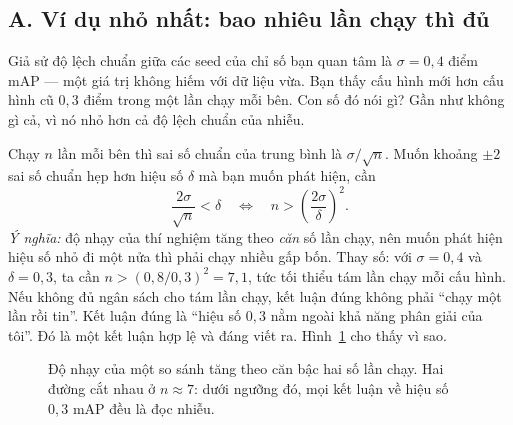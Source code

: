 \documentclass[../../deep_learning.tex]{subfiles}
\begin{document}

\subsection{A. Ví dụ nhỏ nhất: bao nhiêu lần chạy thì đủ}
Giả sử độ lệch chuẩn giữa các seed của chỉ số bạn quan tâm là $\sigma = 0{,}4$ điểm mAP --- một giá trị không hiếm với dữ liệu vừa. Bạn thấy cấu hình mới hơn cấu hình cũ $0{,}3$ điểm trong một lần chạy mỗi bên. Con số đó nói gì? Gần như không gì cả, vì nó nhỏ hơn cả độ lệch chuẩn của nhiễu.

Chạy $n$ lần mỗi bên thì sai số chuẩn của trung bình là $\sigma/\sqrt{n}$. Muốn khoảng $\pm 2$ sai số chuẩn hẹp hơn hiệu số $\delta$ mà bạn muốn phát hiện, cần
\[
\frac{2\sigma}{\sqrt{n}} < \delta \quad\Longleftrightarrow\quad n > \left(\frac{2\sigma}{\delta}\right)^{2}.
\]
\emph{Ý nghĩa:} độ nhạy của thí nghiệm tăng theo \emph{căn} số lần chạy, nên muốn phát hiện hiệu số nhỏ đi một nửa thì phải chạy nhiều gấp bốn. Thay số: với $\sigma = 0{,}4$ và $\delta = 0{,}3$, ta cần $n > (0{,}8/0{,}3)^2 = 7{,}1$, tức tối thiểu tám lần chạy mỗi cấu hình. Nếu không đủ ngân sách cho tám lần chạy, kết luận đúng không phải ``chạy một lần rồi tin''. Kết luận đúng là ``hiệu số $0{,}3$ nằm ngoài khả năng phân giải của tôi''. Đó là một kết luận hợp lệ và đáng viết ra. Hình~\ref{fig:phuong-sai-seed} cho thấy vì sao.

\begin{figure}[H]\centering
{}
\caption{Độ nhạy của một so sánh tăng theo căn bậc hai số lần chạy. Hai đường cắt nhau ở $n \approx 7$: dưới ngưỡng đó, mọi kết luận về hiệu số $0{,}3$ mAP đều là đọc nhiễu.}
\label{fig:phuong-sai-seed}
\end{figure}
\end{document}
